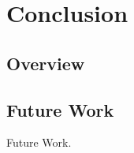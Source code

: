 \chapter{Conclusion}
\label{ch:conclusions}

\section{Overview}


\section{Future Work}

Future Work.